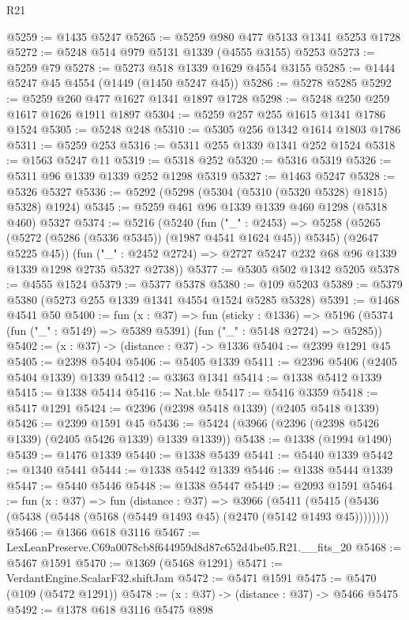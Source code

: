 \begin{lexlean}{R21}
\begin{coremodule}
@5259 := @1435 @5247
@5265 := @5259 @980 @477 @5133 @1341 @5253 @1728
@5272 := @5248 @514 @979 @5131 @1339 (@4555 @3155) @5253
@5273 := @5259 @79
@5278 := @5273 @518 @1339 @1629 @4554 @3155
@5285 := @1444 @5247 @45 @4554 (@1449 (@1450 @5247 @45))
@5286 := @5278 @5285
@5292 := @5259 @260 @477 @1627 @1341 @1897 @1728
@5298 := @5248 @250 @259 @1617 @1626 @1911 @1897
@5304 := @5259 @257 @255 @1615 @1341 @1786 @1524
@5305 := @5248 @248
@5310 := @5305 @256 @1342 @1614 @1803 @1786
@5311 := @5259 @253
@5316 := @5311 @255 @1339 @1341 @252 @1524
@5318 := @1563 @5247 @11
@5319 := @5318 @252
@5320 := @5316 @5319
@5326 := @5311 @96 @1339 @1339 @252 @1298 @5319
@5327 := @1463 @5247
@5328 := @5326 @5327
@5336 := @5292 (@5298 (@5304 (@5310 (@5320 @5328) @1815) @5328) @1924)
@5345 := @5259 @461 @96 @1339 @1339 @460 @1298 (@5318 @460) @5327
@5374 := @5216
    (@5240
      (fun ("_" : @2453) =>
      @5258 (@5265 (@5272 (@5286 (@5336 @5345)) (@1987 @4541 @1624 @45)) @5345) (@2647 @5225 @45))
      (fun ("_" : @2452 @2724) => @2727 @5247 @232 @68 @96 @1339 @1339 @1298 @2735 @5327 @2738))
@5377 := @5305 @502 @1342 @5205
@5378 := @4555 @1524
@5379 := @5377 @5378
@5380 := @109 @5203
@5389 := @5379 @5380 (@5273 @255 @1339 @1341 @4554 @1524 @5285 @5328)
@5391 := @1468 @4541 @50
@5400 := fun (x : @37) =>
  fun (sticky : @1336) =>
  @5196 (@5374 (fun ("_" : @5149) => @5389 @5391) (fun ("_" : @5148 @2724) => @5285))
@5402 := (x : @37) -> (distance : @37) -> @1336
@5404 := @2399 @1291 @45
@5405 := @2398 @5404
@5406 := @5405 @1339
@5411 := @2396 @5406 (@2405 @5404 @1339) @1339
@5412 := @3363 @1341
@5414 := @1338 @5412 @1339
@5415 := @1338 @5414
@5416 := Nat.ble
@5417 := @5416 @3359
@5418 := @5417 @1291
@5424 := @2396 (@2398 @5418 @1339) (@2405 @5418 @1339)
@5426 := @2399 @1591 @45
@5436 := @5424 (@3966 (@2396 (@2398 @5426 @1339) (@2405 @5426 @1339) @1339 @1339))
@5438 := @1338 (@1994 @1490)
@5439 := @1476 @1339
@5440 := @1338 @5439
@5441 := @5440 @1339
@5442 := @1340 @5441
@5444 := @1338 @5442 @1339
@5446 := @1338 @5444 @1339
@5447 := @5440 @5446
@5448 := @1338 @5447
@5449 := @2093 @1591
@5464 := fun (x : @37) =>
  fun (distance : @37) =>
  @3966 (@5411 (@5415 (@5436 (@5438 (@5448 (@5168 (@5449 @1493 @45) (@2470 (@5142 @1493 @45))))))))
@5466 := @1366 @618 @3116
@5467 := LexLeanPreserve.C69a0078cb8f644959d8d87c652d4be05.R21.__fits_20
@5468 := @5467 @1591
@5470 := @1369 (@5468 @1291)
@5471 := VerdantEngine.ScalarF32.shiftJam
@5472 := @5471 @1591
@5475 := @5470 (@109 (@5472 @1291))
@5478 := (x : @37) -> (distance : @37) -> @5466 @5475
@5492 := @1378
    @618
    @3116
    @5475
    @898

\end{coremodule}
\end{lexlean}
